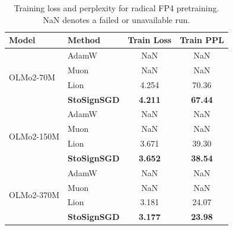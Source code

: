 \documentclass{article}
\begin{document}
\begin{table}[ht]
    \centering
    \caption{Training loss and perplexity for radical FP4 pretraining.
    NaN denotes a failed or unavailable run.\label{tab:fp4-train}}
    \vspace{-5pt}
    \begin{tabular}{llcc}
        \toprule
        \textbf{Model}
        & \textbf{Method}
        & \textbf{Train Loss}
        & \textbf{Train PPL} \\
        \midrule

        \multirow{4}{*}{OLMo2-70M}
        & AdamW
        & NaN
        & NaN \\

        & Muon
        & NaN
        & NaN \\

        & Lion
        & 4.254
        & 70.36 \\

        & \cellcolor{yellow!20}\textbf{StoSignSGD}
        & \cellcolor{yellow!20}\textbf{4.211}
        & \cellcolor{yellow!20}\textbf{67.44} \\

        \midrule

        \multirow{4}{*}{OLMo2-150M}
        & AdamW
        & NaN
        & NaN \\

        & Muon
        & NaN
        & NaN \\

        & Lion
        & 3.671
        & 39.30 \\

        & \cellcolor{yellow!20}\textbf{StoSignSGD}
        & \cellcolor{yellow!20}\textbf{3.652}
        & \cellcolor{yellow!20}\textbf{38.54} \\

        \midrule

        \multirow{4}{*}{OLMo2-370M}
        & AdamW
        & NaN
        & NaN \\

        & Muon
        & NaN
        & NaN \\

        & Lion
        & 3.181
        & 24.07 \\

        & \cellcolor{yellow!20}\textbf{StoSignSGD}
        & \cellcolor{yellow!20}\textbf{3.177}
        & \cellcolor{yellow!20}\textbf{23.98} \\

        \bottomrule
    \end{tabular}
    \vspace{-10pt}
\end{table}
\end{document}
